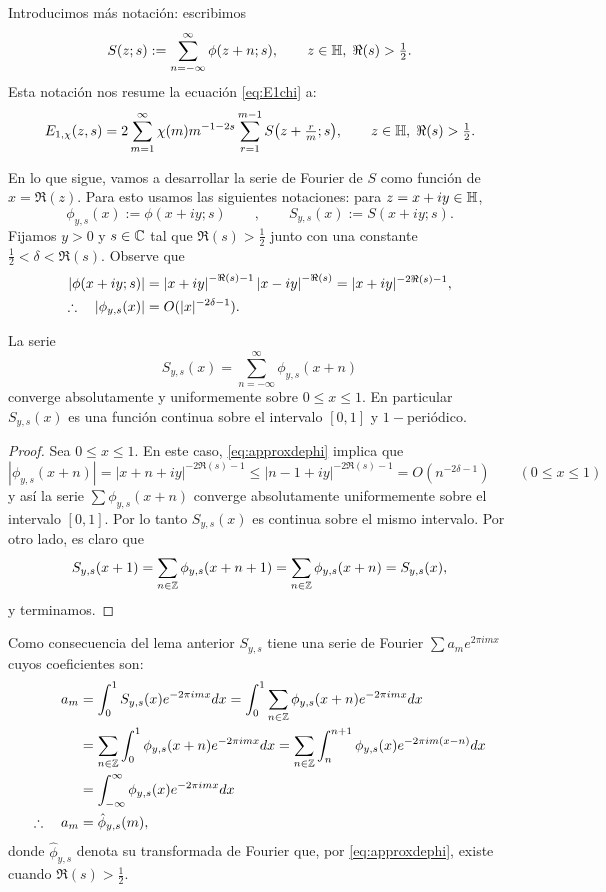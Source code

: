 \documentclass[../../tesis_maestria]{subfiles}
\begin{document}
Introducimos m\'as notaci\'on: escribimos
\begin{equation}\label{eq:S}
  S(z;s):=\sum_{n=-\infty}^{\infty}\phi(z+n;s),\qquad z\in\mathbb{H},\;\Re(s)>\tfrac{1}{2}.
\end{equation}
Esta notaci\'on nos resume la ecuaci\'on \eqref{eq:E1chi} a:
\begin{equation}
  \label{eq:EviaS}
  E_{1,\chi}(z,s)=2\sum_{m=1}^{\infty}\chi(m)m^{-1-2s}\sum_{r=1}^{m-1}S\big(z+\tfrac{r}{m};s\big),
  \qquad z\in\mathbb{H},\;\Re(s)>\tfrac{1}{2}.
\end{equation}

En lo que sigue, vamos a desarrollar la serie de Fourier de $S$ como funci\'on de $x=\Re(z)$.
Para esto usamos las siguientes notaciones: para $z=x+iy\in\mathbb{H}$,
\[
  \phi_{y,s}(x):=\phi(x+iy;s)\qquad,\qquad S_{y,s}(x):=S(x+iy;s).
\]
Fijamos $y>0$ y $s\in\mathbb{C}$ tal que $\Re(s)>\tfrac{1}{2}$ junto con una constante $\tfrac{1}{2}<\delta<\Re(s)$.
Observe que
\begin{align}
  \left| \phi(x+iy;s) \right|
  &=\left| x+iy \right|^{-\Re(s)-1}\left| x-iy \right|^{-\Re(s)}=|x+iy|^{-2\Re(s)-1},\label{eq:approxdephi}\\
    \therefore\quad|\phi_{y,s}(x)|
  &=O(|x|^{-2\delta-1}).\nonumber
\end{align}

\begin{lema}
  La serie
  \[
    S_{y,s}(x)=\sum_{n=-\infty}^{\infty}\phi_{y,s}(x+n)
  \]
converge absolutamente y uniformemente sobre $0\leq x\leq1$. En particular
$S_{y,s}(x)$ es una funci\'on continua sobre el intervalo $[0,1]$ y $1-$peri\'odico.
\end{lema}

\begin{proof}
Sea $0\leq x\leq1$. En este caso, \eqref{eq:approxdephi} implica que
\[
  |\phi_{y,s}(x+n)|=|x+n+iy|^{-2\Re(s)-1}\leq |n-1+iy|^{-2\Re(s)-1}
  =O(n^{-2\delta-1})\qquad (0\leq x\leq 1)
\]
y as\'i la serie $\sum\phi_{y,s}(x+n)$ converge absolutamente  uniformemente sobre el intervalo
$[0,1]$. Por lo tanto $S_{y,s}(x)$ es continua sobre el mismo intervalo. Por otro lado, es claro que
\[
  S_{y,s}(x+1)
  =\sum_{n\in\mathbb{Z}}\phi_{y,s}(x+n+1)
  =\sum_{n\in\mathbb{Z}}\phi_{y,s}(x+n)
  =S_{y,s}(x),
\]
y terminamos.
\end{proof}


Como consecuencia del lema anterior  $S_{y,s}$ tiene una serie de Fourier
$\sum a_m e^{2\pi imx}$ cuyos coeficientes son:
\begin{align*}
  a_m
  &=\int_0^1 S_{y,s}(x)e^{-2\pi imx}dx
    =\int_0^1\sum_{n\in\mathbb{Z}}\phi_{y,s}(x+n)e^{-2\pi imx}dx\\
  &=\sum_{n\in\mathbb{Z}}\int_0^1\phi_{y,s}(x+n)e^{-2\pi imx}dx
    =\sum_{n\in\mathbb{Z}}\int_n^{n+1}\phi_{y,s}(x)e^{-2\pi im(x-n)}dx\\
  &=\int_{-\infty}^{\infty}\phi_{y,s}(x)e^{-2\pi imx}dx\\
  \therefore\quad a_m
  &=\hat{\phi}_{y,s}(m),
\end{align*}
donde $\hat{\phi}_{y,s}$ denota su transformada de Fourier que,
por \eqref{eq:approxdephi}, existe cuando $\Re(s)>\tfrac{1}{2}$.
\end{document}

